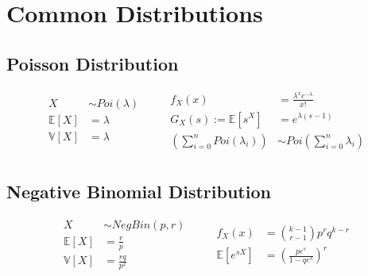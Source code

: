 \section{Common Distributions}
\subsection{Poisson Distribution}
\begin{equation*}
    \begin{aligned}
        X &\sim Poi(\lambda) \qquad\\
        \mathbb{E}[X] &= \lambda \\
        \mathbb{V}[X] &= \lambda \\
    \end{aligned}
    \begin{aligned}
        f_X(x) &= \frac{\lambda^x e^{-\lambda}}{x!} \\
        G_X(s) := \mathbb{E}[s^X] &= e^{\lambda \left(s - 1\right)} \\
        \left(\sum_{i=0}^nPoi(\lambda_i) \right) &\sim Poi \left(\sum_{i=0}^n \lambda_i \right)\\
    \end{aligned}
\end{equation*}

\subsection{Negative Binomial Distribution}
\begin{equation*}
    \begin{aligned}
        X &\sim NegBin(p, r) \qquad\\
        \mathbb{E}[X] &= \frac{r}{p} \\
        \mathbb{V}[X] &= \frac{rq}{p^2} \\
    \end{aligned}
    \begin{aligned}
        f_X(x) &= \binom{k-1}{r-1}p^rq^{k-r} \\
        \mathbb{E}[e^{sX}] &= \left(\frac{pe^s}{1 - qe^s}\right)^r \\
    \end{aligned}
\end{equation*}

